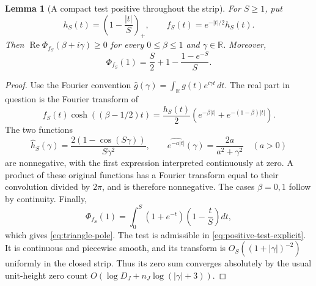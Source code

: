 \documentclass[11pt]{article}
\newtheorem{lemma}[theorem]{Lemma}
\theoremstyle{definition}
\theoremstyle{remark}
\begin{document}
\begin{lemma}[A compact test positive throughout the strip]
\label{lem:strip-positive-triangle}
For $S\geq1$, put
\[
 h_S(t)=\left(1-\frac{|t|}{S}\right)_+,
 \qquad f_S(t)=e^{-|t|/2}h_S(t).
\]
Then $\operatorname{Re}\Phi_{f_S}(\beta+i\gamma)\geq0$
for every $0\leq\beta\leq1$ and $\gamma\in\mathbb R$.
Moreover,
\begin{equation}\label{eq:triangle-pole}
 \Phi_{f_S}(1)=\frac S2+1-\frac{1-e^{-S}}{S}.
\end{equation}
\end{lemma}
\begin{proof}
Use the Fourier convention
$\widehat g(\gamma)=\int_{\mathbb R}g(t)e^{i\gamma t}\,dt$.
The real part in question is the Fourier transform of
\[
 f_S(t)\cosh((\beta-1/2)t)
 =\frac{h_S(t)}2
   \left(e^{-\beta|t|}+e^{-(1-\beta)|t|}\right).
\]
The two functions
\[
 \widehat h_S(\gamma)
 =\frac{2(1-\cos(S\gamma))}{S\gamma^2},
 \qquad
 \widehat{e^{-a|t|}}(\gamma)=\frac{2a}{a^2+\gamma^2}
 \quad(a>0)
\]
are nonnegative, with the first expression interpreted continuously
at zero.  A product of these original functions has a Fourier transform
equal to their convolution divided by $2\pi$, and is therefore
nonnegative.  The cases $\beta=0,1$ follow by continuity.
Finally,
\[
 \Phi_{f_S}(1)=\int_0^S
       (1+e^{-t})\left(1-\frac tS\right)dt,
\]
which gives \eqref{eq:triangle-pole}.
The test is admissible in \eqref{eq:positive-test-explicit}.
It is continuous and piecewise smooth, and its transform is
$O_S((1+|\gamma|)^{-2})$ uniformly in the closed strip.
Thus its zero sum converges absolutely by the usual unit-height
zero count $O(\log D_J+n_J\log(|\gamma|+3))$.
\end{proof}
\end{document}
